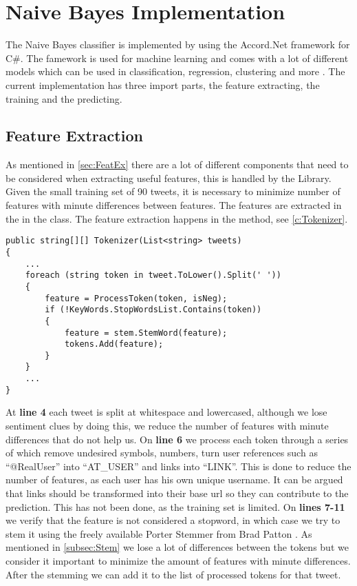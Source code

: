 \section{Naive Bayes Implementation}\label{sec:NBImp}

The Naive Bayes classifier is implemented by using the Accord.Net framework for
C\#. The famework is used for machine learning and comes with a lot of different
models which can be used in classification, regression, clustering and more
\citep{Accord}. The current implementation has three import parts, the feature
extracting, the training and the predicting.

\subsection{Feature Extraction}
As mentioned in \autoref{sec:FeatEx} there are a lot of different components
that need to be considered when extracting useful features, this is handled by
the  Library.
Given the small training set of 90 tweets, it is necessary to minimize number of features with
minute differences between features. The features are extracted in the in the
 class. The feature extraction happens in the
 method, see \autoref{c:Tokenizer}.\nl

\begin{minipage}[H]{\linewidth}
\begin{lstlisting}[caption = Split and process each token in a tweet with
regexes and stemming, label = c:Tokenizer] 
public string[][] Tokenizer(List<string> tweets)
{
    ...
    foreach (string token in tweet.ToLower().Split(' '))
    {
        feature = ProcessToken(token, isNeg);
        if (!KeyWords.StopWordsList.Contains(token))
        {
        	feature = stem.StemWord(feature);
	        tokens.Add(feature);
    	}
	}
	...
}
\end{lstlisting}
\end{minipage}

At \textbf{line 4} each tweet is split at whitespace and lowercased, although we
lose sentiment clues by doing this, we reduce the number of features with
minute differences that do not help us. On \textbf{line 6} we process each
token through a series of  which remove undesired symbols,
numbers, turn user references such as ``@RealUser'' into ``AT\_USER'' and links
into ``LINK''. This is done to reduce the number of features, as each user has
his own unique username. It can be argued that links should be transformed into
their base url so they can contribute to the prediction. This has not been
done, as the training set is limited. On \textbf{lines 7-11} we verify that the
feature is not considered a stopword, in which case we try to stem it using the
freely available Porter Stemmer from Brad Patton \citep{PorterStem}. As
mentioned in \autoref{subsec:Stem} we lose a lot of differences between the
tokens but we consider it important to minimize the amount of features with
minute differences. After the stemming we can add it to the list of processed
tokens for that tweet.


